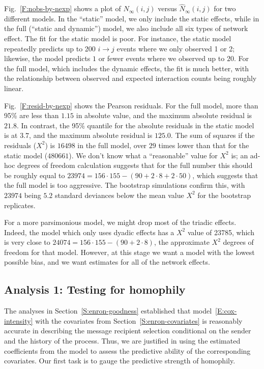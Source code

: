 \documentclass[final]{statsoc}
\begin{document}
Fig.~\ref{F:nobs-by-nexp} shows a plot of $N_\infty(i,j)$ versus $\hat
N_\infty(i,j)$ for two different models.  In the ``static'' model, we only
include the static effects, while in the full (``static and dynamic'') model,
we also include all six types of network effect.  The fit for the static model
is poor.  For instance, the static model repeatedly predicts up to 200 $i \to
j$ events where we only observed 1 or 2; likewise, the model predicts $1$ or
fewer events where we observed up to $20$.  For the full model, which includes
the dynamic effects, the fit is much better, with the relationship between
observed and expected interaction counts being roughly linear.

Fig.~\ref{F:resid-by-nexp} shows the Pearson residuals.  For the full model,
more than 95\% are less than $1.15$ in absolute value, and the maximum
absolute residual is $21.8$.  In contrast, the 95\% quantile for the absolute
residuals in the static model is at $3.7$, and the maximum absolute residual
is $125.0$.  The sum of squares if the residuals ($X^2$) is $16498$ in the
full model, over $29$ times lower than that for the static model ($480661$).
We don't know what a ``reasonable'' value for $X^2$ is; an ad-hoc degrees of
freedom calculation suggests that for the full number this should be roughly
equal to $23974 = 156 \cdot 155 - (90 + 2 \cdot 8 + 2 \cdot 50)$, which
suggests that the full model is too aggressive.  The bootstrap simulations
confirm this, with $23974$ being $5.2$ standard deviances below the mean
value $X^2$ for the bootstrap replicates.

For a more parsimonious model, we might drop most of the triadic effects.
Indeed, the model which only uses dyadic effects has a $X^2$ value of 23785,
which is very close to $24074 = 156 \cdot 155 - (90 + 2 \cdot 8)$, the
approximate $X^2$ degrees of freedom for that model.  However, at this stage
we want a model with the lowest possible bias, and we want estimates for all
of the network effects.


\subsection{Analysis 1: Testing for homophily}\label{S:enron-homophily}

The analyses in Section~\ref{S:enron-goodness} established that
model~\eqref{E:cox-intensity} with the covariates from
Section~\ref{S:enron-covariates} is reasonably accurate in describing the
message recipient selection conditional on the sender and the history of the
process.  Thus, we are justified in using the estimated coefficients from the
model to assess the predictive ability of the corresponding covariates.  Our
first task is to gauge the predictive strength of homophily.  
\end{document}
